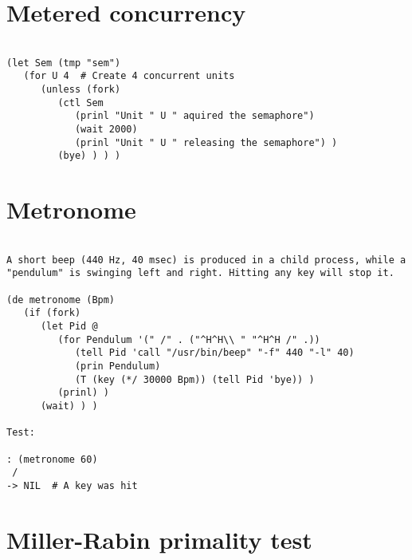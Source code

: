 \section*{Metered concurrency}

\begin{verbatim}

(let Sem (tmp "sem")
   (for U 4  # Create 4 concurrent units
      (unless (fork)
         (ctl Sem
            (prinl "Unit " U " aquired the semaphore")
            (wait 2000)
            (prinl "Unit " U " releasing the semaphore") )
         (bye) ) ) )

\end{verbatim}

\section*{Metronome}

\begin{verbatim}

A short beep (440 Hz, 40 msec) is produced in a child process, while a
"pendulum" is swinging left and right. Hitting any key will stop it.

(de metronome (Bpm)
   (if (fork)
      (let Pid @
         (for Pendulum '(" /" . ("^H^H\\ " "^H^H /" .))
            (tell Pid 'call "/usr/bin/beep" "-f" 440 "-l" 40)
            (prin Pendulum)
            (T (key (*/ 30000 Bpm)) (tell Pid 'bye)) )
         (prinl) )
      (wait) ) )

Test:

: (metronome 60)
 /
-> NIL  # A key was hit

\end{verbatim}

\section*{Miller-Rabin primality test}

